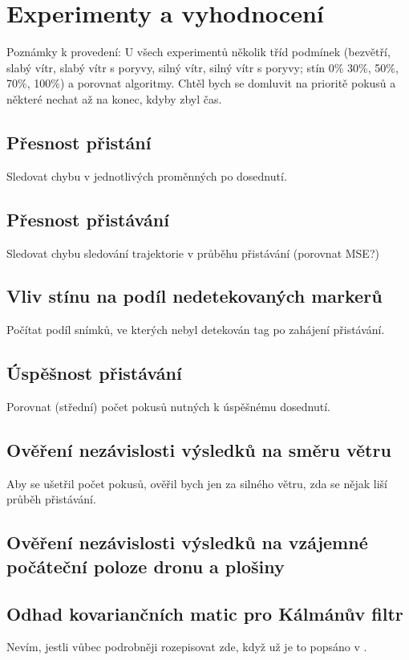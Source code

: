 \chapter{Experimenty a vyhodnocení} \label{chap:eval}
Poznámky k provedení: U všech experimentů několik tříd podmínek (bezvětří, slabý vítr, slabý vítr s poryvy, silný vítr, silný vítr s poryvy; stín 0\% 30\%, 50\%, 70\%, 100\%) a porovnat algoritmy. Chtěl bych se domluvit na prioritě pokusů a některé nechat až na konec, kdyby zbyl čas.
\section{Přesnost přistání}
  Sledovat chybu v jednotlivých proměnných po dosednutí.
\section{Přesnost přistávání}
  Sledovat chybu sledování trajektorie v průběhu přistávání (porovnat MSE?)
\section{Vliv stínu na podíl nedetekovaných markerů}
  Počítat podíl snímků, ve kterých nebyl detekován tag po zahájení přistávání.
\section{Úspěšnost přistávání}
  Porovnat (střední) počet pokusů nutných k úspěšnému dosednutí.
\section{Ověření nezávislosti výsledků na směru větru}
  Aby se ušetřil počet pokusů, ověřil bych jen za silného větru, zda se nějak liší průběh přistávání.
\section{Ověření nezávislosti výsledků na vzájemné počáteční poloze dronu a plošiny}
\section{Odhad kovariančních matic pro Kálmánův filtr}
  Nevím, jestli vůbec podrobněji rozepisovat zde, když už je to popsáno v .
